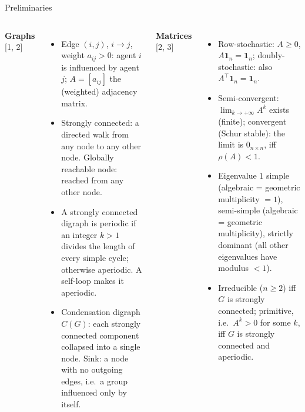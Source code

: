 \begin{frame}[label=m-prelim]{Preliminaries}
  \footnotesize
  \begin{columns}[T]
      \textbf{Graphs} [1, 2]
      \begin{itemize}
        \item Edge $(i,j)$, $i \to j$, weight $a_{ij} > 0$: agent $i$ is influenced by
              agent $j$; $A = [a_{ij}]$ the (weighted) adjacency matrix.
        \item \alert{Strongly connected}: a directed walk from any node to any other
              node. \alert{Globally reachable} node: reached from any other node.
        \item A strongly connected digraph is \alert{periodic} if an integer $k > 1$
              divides the length of every simple cycle; otherwise \alert{aperiodic}.
              A self-loop makes it aperiodic.
        \item \alert{Condensation digraph} $C(G)$: each strongly connected component
              collapsed into a single node. \alert{Sink}: a node with no outgoing edges,
              i.e.\ a group influenced only by itself.
      \end{itemize}
      \textbf{Matrices} [2, 3]
      \begin{itemize}
        \item \alert{Row-stochastic}: $A \geq 0$, $A\mathbf{1}_n = \mathbf{1}_n$;
              \alert{doubly-stochastic}: also $A^\top\mathbf{1}_n = \mathbf{1}_n$.
        \item \alert{Semi-convergent}: $\lim_{k \to +\infty} A^k$ exists (finite);
              \alert{convergent} (Schur stable): the limit is $0_{n \times n}$, iff
              $\rho(A) < 1$.
        \item Eigenvalue $1$ \alert{simple} (algebraic = geometric multiplicity $= 1$),
              \alert{semi-simple} (algebraic = geometric multiplicity),
              \alert{strictly dominant} (all other eigenvalues have modulus $< 1$).
        \item \alert{Irreducible} ($n \geq 2$) iff $G$ is strongly connected;
              \alert{primitive}, i.e.\ $A^k > 0$ for some $k$, iff $G$ is strongly
              connected and aperiodic.
      \end{itemize}
  \end{columns}
\end{frame}


